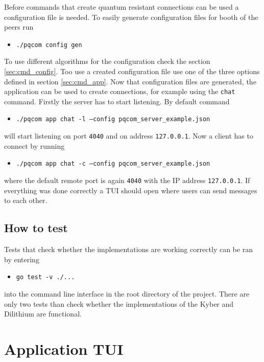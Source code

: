 Before commands that create quantum resistant connections can be used a configuration file is needed. To easily generate configuration files for booth of the peers run
\begin{itemize}
  \item \texttt{./pqcom config gen}
\end{itemize}
To use different algorithms for the configuration check the section \ref{sec:cmd_config}. Too use a created configuration file use one of the three options defined in section \ref{sec:cmd_app}. Now that configuration files are generated, the application can be used to create connections, for example using the \texttt{chat} command. Firstly the server has to start listening. By default command
\begin{itemize}
  \item \texttt{./pqcom app chat -l --config pqcom\_server\_example.json}
\end{itemize}
will start listening on port \texttt{4040} and on address \texttt{127.0.0.1}. Now a client has to connect by running
\begin{itemize}
  \item \texttt{./pqcom app chat -c --config pqcom\_server\_example.json}
\end{itemize}
where the default remote port is again \texttt{4040} with the IP address \texttt{127.0.0.1}. If everything was done correctly a TUI should open where users can send messages to each other.

\section{How to test}
Tests that check whether the implementations are working correctly can be ran by entering
\begin{itemize}
  \item \texttt{go test -v ./...}
\end{itemize}
into the command line interface in the root directory of the project. There are only two tests than check whether the implementations of the Kyber and Dilithium are functional.

\chapter{Application TUI}
\label{ch:TUI_example}
